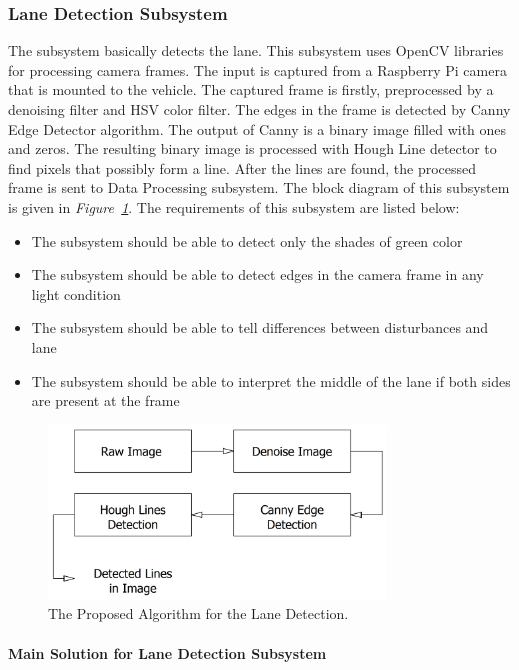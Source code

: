 \documentclass[a4paper,12pt]{article}
\begin{document}
	
	\subsubsection{Lane Detection Subsystem}
	The subsystem basically detects the lane. This subsystem uses OpenCV libraries for processing camera frames. The input is captured from a Raspberry Pi camera that is mounted to the vehicle. The captured frame is firstly, preprocessed by a denoising filter and HSV color filter. The edges in the frame is detected by Canny Edge Detector algorithm. The output of Canny is a binary image filled with ones and zeros. The resulting binary image is processed with Hough Line detector to find pixels that possibly form a line. After the lines are found, the processed frame is sent to Data Processing subsystem. The block diagram of this subsystem is given in \textit{Figure~\ref{fig:lane_detection_subsystem}}. The requirements of this subsystem are listed below:
	\begin{itemize}
		\item The subsystem should be able to detect only the shades of green color
		\item The subsystem should be able to detect edges in the camera frame in any light condition
		\item The subsystem should be able to tell differences between disturbances and lane
		\item The subsystem should be able to interpret the middle of the lane if both sides are present at the frame
	\end{itemize}
	
	\begin{figure}[h]
		\center
		\setlength{\unitlength}{\textwidth} 
		\includegraphics[width=0.8\textwidth]{v-models/lane_detection_subsystem}
		\caption{\label{fig:lane_detection_subsystem}The Proposed Algorithm for the Lane Detection.}
	\end{figure}
	
	\paragraph{Main Solution for Lane Detection Subsystem}
		
\end{document}
